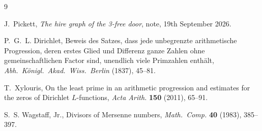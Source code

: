 \documentclass[11pt,a4paper]{article}
\theoremstyle{remark}
\begin{document}
\begin{thebibliography}{9}

J.~Pickett,
\emph{The hire graph of the 3-free door},
note, 19th September 2026.

P.~G.~L. Dirichlet,
Beweis des Satzes, dass jede unbegrenzte arithmetische Progression, deren erstes Glied und Differenz ganze Zahlen ohne gemeinschaftlichen Factor sind, unendlich viele Primzahlen enth\"alt,
\emph{Abh.\ K\"onigl.\ Akad.\ Wiss.\ Berlin} (1837), 45--81.

T.~Xylouris,
On the least prime in an arithmetic progression and estimates for the zeros of Dirichlet \(L\)-functions,
\emph{Acta Arith.} \textbf{150} (2011), 65--91.

S.~S. Wagstaff, Jr.,
Divisors of Mersenne numbers,
\emph{Math.\ Comp.} \textbf{40} (1983), 385--397.

\end{thebibliography}
\end{document}
